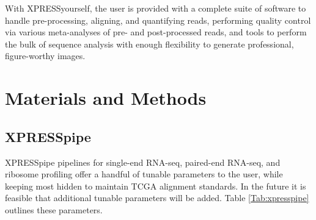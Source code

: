 \documentclass[11pt, a4paper, oneside]{article}
\begin{document}
With XPRESSyourself, the user is provided with a complete suite of software to handle pre-processing, aligning, and quantifying reads, performing quality control via various meta-analyses of pre- and post-processed reads, and tools to perform the bulk of sequence analysis with enough flexibility to generate professional, figure-worthy images.

\section{Materials and Methods}

\subsection{XPRESSpipe}
XPRESSpipe pipelines for single-end RNA-seq, paired-end RNA-seq, and ribosome profiling offer a handful of tunable parameters to the user, while keeping most hidden to maintain TCGA alignment standards. In the future it is feasible that additional tunable parameters will be added. Table \ref{Tab:xpresspipe} outlines these parameters.
\end{document}
